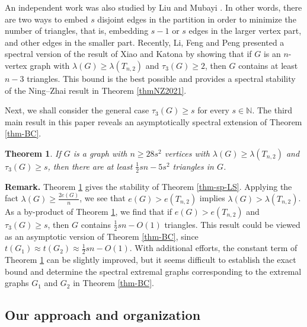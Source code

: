 \documentclass[11pt]{article}
\newtheorem{theorem}{Theorem}[section]
\begin{document}
An independent work was also studied by Liu and Mubayi \cite[Theorem 1.4]{LM2022-Erd-Rad}. 
In other words, there are two ways to embed 
$s$ disjoint edges in the partition 
in order to minimize the number of triangles, that is, 
embedding $s-1$ or $s$ edges in the larger vertex part, and other edges in the smaller part.   
Recently, Li, Feng and Peng \cite{LFP-count-bowtie} 
presented a spectral version of the result of Xiao and Katona \cite{XK2021} 
by showing that if $G$ is an $n$-vertex graph with 
$\lambda (G)\ge \lambda (T_{n,2})$ and $\tau_3(G)\ge 2$, 
then $G$ contains at least $n-3$ triangles. 
This bound is the best possible and provides a spectral stability of the Ning--Zhai result in Theorem \ref{thmNZ2021}. 

\medskip 
Next, we shall consider the general case  $\tau_3(G)\ge s$ for every $s\in \mathbb{N}$. 
The third main result in this paper reveals an asymptotically spectral extension of Theorem \ref{thm-BC}.  

\begin{theorem} \label{spectral-BC}
If $G$ is a graph with $n\ge 28s^2$ vertices with
 $\lambda (G)\ge \lambda (T_{n,2})$ and $\tau_3(G)\ge s$, 
 then there are at least $\frac{1}{2} sn - 5s^2$ triangles in $G$. 
\end{theorem}


\noindent 
{\bf Remark.}  
Theorem \ref{spectral-BC} gives the stability of Theorem \ref{thm-sp-LS}. 
Applying the fact $\lambda (G)\ge \frac{2e(G)}{n}$, we see that 
$e(G)> e(T_{n,2})$ implies $\lambda (G) > \lambda (T_{n,2})$. 
As a by-product of Theorem \ref{spectral-BC}, 
we find that if $e(G)> e(T_{n,2})$ and $\tau_3(G)\ge s$, 
then $G$ contains $\frac{1}{2}sn - O(1)$ triangles. 
This result could be viewed as an asymptotic version of 
Theorem \ref{thm-BC}, since $t(G_1) \approx t(G_2) \approx \frac{1}{2}sn - O(1)$. 
With additional efforts,  the constant term of Theorem \ref{spectral-BC} can be slightly  improved, 
but it seems difficult to establish the exact bound and  
determine the spectral extremal graphs corresponding to the extremal graphs $G_1$ and $G_2$ in Theorem \ref{thm-BC}. 



\subsection{Our approach and organization}
\end{document}
